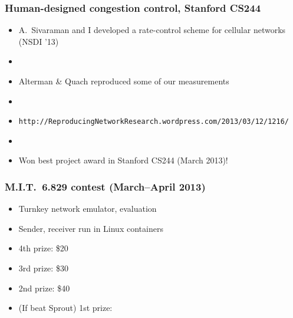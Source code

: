 \documentclass[svgnames]{beamer}
\begin{document}
\begin{frame}
\frametitle{Human-designed congestion control, Stanford CS244}

\begin{itemize}
\item A.~Sivaraman and I developed a rate-control scheme for cellular networks (NSDI '13)

\item[]

\item Alterman \& Quach reproduced some of our measurements

\item[]

\item {\scriptsize\texttt{http://ReproducingNetworkResearch.wordpress.com/2013/03/12/1216/}}

\item[]

\item Won best project award in Stanford CS244 (March 2013)!

\end{itemize}

\end{frame}

\begin{frame}
\frametitle{M.I.T.~6.829 contest (March--April 2013)}

\begin{itemize}
\item Turnkey network emulator, evaluation

\item Sender, receiver run in Linux containers

\item 4th prize: \$20

\item 3rd prize: \$30

\item 2nd prize: \$40

\item (If beat Sprout) 1st prize: \pause {\color{DarkBlue}{\bf Co-authorship on future paper}}

\end{itemize}

\vspace{\baselineskip}
\vspace{\baselineskip}
\vspace{\baselineskip}


\end{frame}
\end{document}
